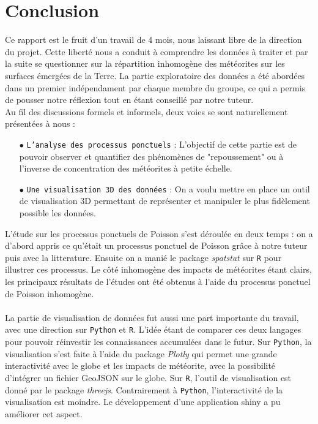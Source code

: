\documentclass[12pt]{article}
\begin{document}
\section{Conclusion}
Ce rapport est le fruit d'un travail de 4 mois, nous laissant libre de la direction du projet. Cette liberté nous a conduit à comprendre les données à traiter et par la suite se questionner sur la répartition inhomogène des météorites sur les surfaces émergées de la Terre. 
La partie exploratoire des données a été abordées dans un premier indépendament par chaque membre du groupe, ce qui a permis de pousser notre réflexion tout en étant conseillé par notre tuteur.
\\
Au fil des discussions formels et informels, deux voies se sont naturellement présentées à nous :
\\
\begin{itemize}
    \item[$\bullet$] \texttt{L'analyse des processus ponctuels} : L'objectif de cette partie est de pouvoir observer et quantifier des phénomènes de "repoussement" ou à l'inverse de concentration des météorites à petite échelle.
    \\
    \item[$\bullet$] \texttt{Une visualisation 3D des données} : On a voulu mettre en place un outil de visualisation 3D permettant de représenter et manipuler le plus fidèlement possible les données.\\
\end{itemize}
L'étude sur les processus ponctuels de Poisson s'est déroulée en deux temps : on a d'abord appris ce qu'était un processus ponctuel de Poisson grâce à notre tuteur puis avec la litterature. Ensuite on a manié le package \textit{spatstat} sur \texttt{R} pour illustrer ces processus. Le côté inhomogène des impacts de météorites étant clairs, les principaux résultats de l'études ont été obtenus à l'aide du processus ponctuel de Poisson inhomogène.\\
\\
La partie de visualisation de données fut aussi une part importante du travail, avec une direction sur \texttt{Python} et \texttt{R}. L'idée étant de comparer ces deux langages pour pouvoir réinvestir les connaissances accumulées dans le futur. Sur \texttt{Python}, la visualisation s'est faite à l'aide du package \textit{Plotly} qui permet une grande interactivité avec le globe et les impacts de météorite, avec la possibilité d'intégrer un fichier GeoJSON sur le globe. Sur \texttt{R}, l'outil de visualisation est donné par le package \textit{threejs}. Contrairement à \texttt{Python}, l'interactivité de la visualisation est moindre. Le développement d'une application shiny a pu améliorer cet aspect.\\
\end{document}

